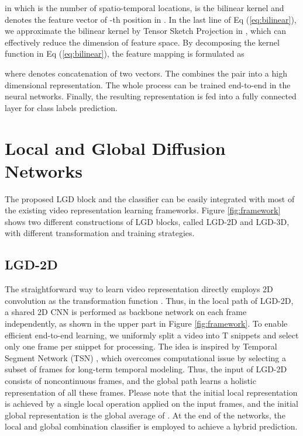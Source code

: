 \documentclass[10pt,twocolumn,letterpaper]{article}
\begin{document}
in which  is the number of spatio-temporal locations,  is the bilinear kernel and  denotes the feature vector of -th position in . In the last line of Eq (\ref{eq:bilinear}), we approximate the bilinear kernel by Tensor Sketch Projection  in \cite{gao2016compact}, which can effectively reduce the dimension of feature space.
By decomposing the kernel function in Eq (\ref{eq:bilinear}), the feature mapping is formulated as

where  denotes concatenation of two vectors. The  combines the pair into a high dimensional representation. The whole process can be trained end-to-end in the neural networks. Finally, the resulting representation is fed into a fully connected layer for class labels prediction.

\section{Local and Global Diffusion Networks} \label{sec:LGDN}
The proposed LGD block and the classifier can be easily integrated with most of the existing video representation learning frameworks. Figure \ref{fig:framework} shows two different constructions of LGD blocks, called LGD-2D and LGD-3D, with different transformation  and training strategies.

\subsection{LGD-2D}
The straightforward way to learn video representation directly employs 2D convolution as the transformation function . Thus, in the local path of LGD-2D, a shared 2D CNN is performed as backbone network on each frame independently, as shown in the upper part in Figure \ref{fig:framework}. To enable efficient end-to-end learning, we uniformly split a video into T snippets and select only one frame per snippet for processing. The idea is inspired by Temporal Segment Network (TSN) \cite{wang2016temporal,wang2018temporal}, which overcomes computational issue by selecting a subset of frames for long-term temporal modeling. Thus, the input of LGD-2D consists of  noncontinuous frames, and the global path learns a holistic representation of all these frames. Please note that the initial local representation  is achieved by a single local operation  applied on the input frames, and the initial global representation  is the global average of . At the end of the networks, the local and global combination classifier is employed to achieve a hybrid prediction.
\end{document}
